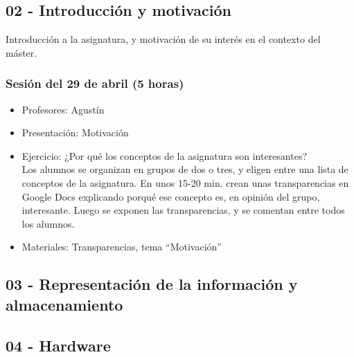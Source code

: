 \documentclass[a4paper,12pt]{article}
\begin{document}
\subsection{02 - Introducción y motivación}

Introducción a la asignatura, y motivación de su interés en el contexto del máster.

\subsubsection{Sesión del 29 de abril (5 horas)}

\begin{itemize}
\item Profesores: Agustín
\item Presentación: Motivación
\item Ejercicio: ¿Por qué los conceptos de la asignatura son interesantes? \\
  Los alumnos se organizan en grupos de dos o tres, y eligen entre una lista de conceptos de la asignatura. En unos 15-20 min. crean unas transparencias en Google Docs explicando porqué ese concepto es, en opinión del grupo, interesante. Luego se exponen las transparencias, y se comentan entre todos los alumnos.
\item Materiales: Transparencias, tema ``Motivación''
\end{itemize}


\subsection{03 - Representación de la información y almacenamiento}

\subsection{04 - Hardware}
\end{document}

